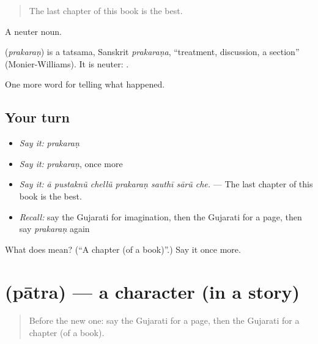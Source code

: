 \begin{quote}
The last chapter of this book is the best.
\end{quote}

A neuter noun.

\begin{cousinweb}
\textbf{} (\emph{prakaraṇ}) is a tatsama, Sanskrit \emph{prakaraṇa}, \textquotedblleft{}treatment, discussion, a section\textquotedblright{} (Monier-Williams). It is neuter: \textbf{ }.
\end{cousinweb}

\begin{grammarlens}[title={What you've built}]
One more word for telling what happened.
\end{grammarlens}

\subsection*{Your turn}
\begin{itemize}
\raggedright
  \item \emph{Say it:} \emph{prakaraṇ}
  \item \emph{Say it:} \emph{prakaraṇ}, once more
  \item \emph{Say it:} \emph{ā pustaknũ chellũ prakaraṇ sauthī sārũ che.} — The last chapter of this book is the best.
  \item \emph{Recall:} say the Gujarati for imagination, then the Gujarati for a page, then say \emph{prakaraṇ} again
\end{itemize}

\begin{tcolorbox}[breakable,colback=teal!4,colframe=teal!35!black,title={Before you move on}]
What does  mean? (\textquotedblleft{}A chapter (of a book)\textquotedblright{}.) Say it once more.
\end{tcolorbox}
\section[\texorpdfstring{\gu{પાત્ર} (pātra)}{પાત્ર (pātra)}]{ (pātra) — a character (in a story)}

\label{lesson:GU-C337-patra}



\begin{quote}
Before the new one: say the Gujarati for a page, then the Gujarati for a chapter (of a book).
\end{quote}

